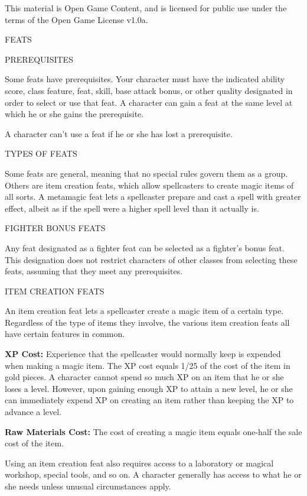 \documentclass{article}
\begin{document}
This material is Open Game Content, and is licensed for public use under the terms 
of the Open Game License v1.0a.

{\LARGE{}FEATS}

\vspace{12pt}
{\LARGE{}PREREQUISITES}

Some feats have prerequisites. Your character must have the indicated ability score, 
class feature, feat, skill, base attack bonus, or other quality designated in order 
to select or use that feat. A character can gain a feat at the same level at which 
he or she gains the prerequisite.

A character can't use a feat if he or she has lost a prerequisite.

\vspace{12pt}
{\LARGE{}TYPES OF FEATS}

Some feats are general, meaning that no special rules govern them as a group. Others 
are item creation feats, which allow spellcasters to create magic items of all 
sorts. A metamagic feat lets a spellcaster prepare and cast a spell with greater 
effect, albeit as if the spell were a higher spell level than it actually is.

\vspace{12pt}
FIGHTER BONUS FEATS

Any feat designated as a fighter feat can be selected as a fighter's bonus feat. 
This designation does not restrict characters of other classes from selecting these 
feats, assuming that they meet any prerequisites.

\vspace{12pt}
ITEM CREATION FEATS

An item creation feat lets a spellcaster create a magic item of a certain type. 
Regardless of the type of items they involve, the various item creation feats all 
have certain features in common.

\textbf{XP Cost:} Experience that the spellcaster would normally keep is expended 
when making a magic item. The XP cost equals 1/25 of the cost of the item in gold 
pieces. A character cannot spend so much XP on an item that he or she loses a level. 
However, upon gaining enough XP to attain a new level, he or she can immediately 
expend XP on creating an item rather than keeping the XP to advance a level.

\textbf{Raw Materials Cost:} The cost of creating a magic item equals one-half 
the sale cost of the item.

Using an item creation feat also requires access to a laboratory or magical workshop, 
special tools, and so on. A character generally has access to what he or she needs 
unless unusual circumstances apply.
\end{document}

